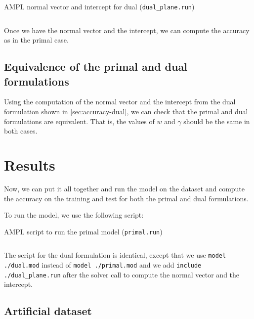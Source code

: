 \begin{listing}[H]
	\caption{AMPL normal vector and intercept for dual (\texttt{dual\_plane.run})}
    \label{lst:dual_plane}
    \inputminted{ampl}{../ampl/dual_plane.run}
\end{listing}

Once we have the normal vector and the intercept, we can
compute the accuracy as in the primal case.

\subsection{Equivalence of the primal and dual formulations}
Using the computation of the normal vector and the intercept
from the dual formulation shown in \cref{sec:accuracy-dual},
we can check that the primal and dual formulations are
equivalent. That is, the values of $w$ and $\gamma$ should be
the same in both cases.


\pagebreak
\section{Results}

Now, we can put it all together and run the model on the
dataset and compute the accuracy on the training and test
for both the primal and dual formulations.

To run the model, we use the following script:
\begin{listing}[H]
    \caption{AMPL script to run the primal model (\texttt{primal.run})}
    \inputminted{ampl}{../ampl/primal.run}
\end{listing}

The script for the dual formulation is identical, except
that we use \texttt{model ./dual.mod} instead of
\texttt{model ./primal.mod} and we add 
\texttt{include ./dual_plane.run} after the
solver call to compute the normal vector and the intercept.


\pagebreak
\subsection{Artificial dataset}

